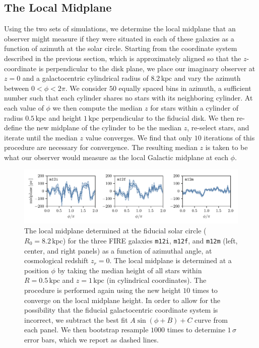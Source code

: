 \documentclass[twocolumn]{aastex62}
\newcommand{\kpc}{\text{kpc}}
\newcommand{\mi}{\texttt{m12i}}
\newcommand{\mf}{\texttt{m12f}}
\newcommand{\mm}{\texttt{m12m}}
\newcommand{\z}{z_r}
\begin{document}
\subsection{The Local Midplane} \label{ssec:local_midplane}
Using the two sets of simulations, we determine the local midplane that an
observer might measure if they were situated in each of these galaxies as a
function of azimuth at the solar circle. Starting from the coordinate system
described in the previous section, which is approximately aligned so that the
$z$-coordinate is perpendicular to the disk plane, we place our imaginary
observer at $z=0$ and a galactocentric cylindrical radius of $8.2\,\kpc$ and
vary the azimuth between $0<\phi<2\pi$. We consider $50$ equally spaced bins in azimuth, a sufficient number
such that each cylinder shares no stars with its neighboring cylinder. At each value of $\phi$ we then
compute the median $z$ for stars within a cylinder of radius $0.5\,\kpc$ and
height $1\,\kpc$ perpendicular to the fiducial disk. We then re-define the new
midplane of the cylinder to be the median $z$, re-select stars, and iterate
until the median $z$ value converges. We find that only $10$ iterations of
this procedure are necessary for convergence. The resulting median $z$ is
taken to be what our observer would measure as the local Galactic midplane at
each $\phi$.

\begin{figure}[htb!]
\begin{center}
\includegraphics[width=\textwidth]{fig/midplane_fit.pdf}
\end{center}
\caption{The local midplane determined at the fiducial solar circle
($R_0 = 8.2\,\kpc$) for the three FIRE galaxies \mi{}, \mf{}, and \mm{} (left,
center, and right panels) as a function of azimuthal angle, at cosmological redshift $\z =0$. The local midplane is determined at
a position $\phi$ by taking the median height of all stars within
$R=0.5\,\kpc$ and $z=1\,\kpc$ (in cylindrical coordinates). The procedure is
performed again using the new height $10$ times to converge on the local
midplane height. In order to allow for the possibility that the fiducial
galactocentric coordinate system is incorrect, we subtract the best fit
$A\sin{(\phi+B)}+C$ curve from each panel. We then bootstrap resample $1000$ times to determine
$1\,\sigma $ error bars, which we report as dashed lines.}
\label{fig:midplane}
\end{figure}
\end{document}
